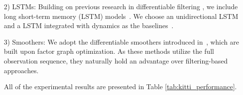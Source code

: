     2) LSTMs: Building on previous research in differentiable filtering \cite{kloss2021train, haarnoja2016backprop}, we include long short-term memory (LSTM) models~\cite{graves2012long}. We choose an unidirectional LSTM and a LSTM integrated with dynamics as the baselines~\cite{kloss2021train}. 

    3) Smoothers: We adopt the differentiable smoothers introduced in~\cite{yi2021differentiable}, which are built upon factor graph optimization. As these methods utilize the full observation sequence, they naturally hold an advantage over filtering-based approaches.

All of the experimental results are presented in Table \ref{tab:kitti_performance}. 
\begin{table}[!t]
\centering 
\caption{Performance comparison of DiffPF and baseline models on KITTI dataset.}
\label{tab:kitti_performance}
\vspace{-0.3cm}  
\end{table}

